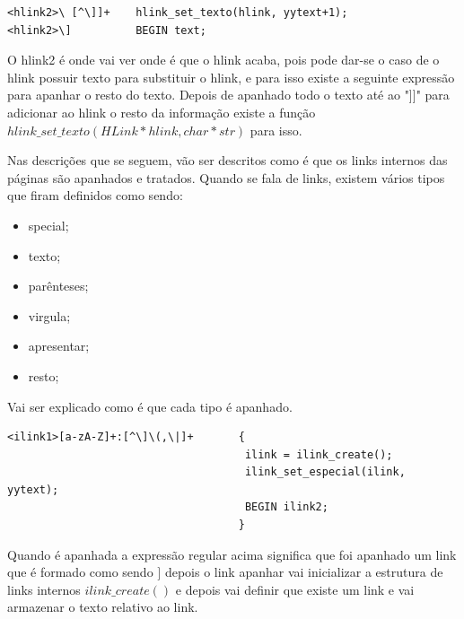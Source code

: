 \documentclass[11pt, a4paper, oneside]{article}
\begin{document}
\begin{verbatim}
<hlink2>\ [^\]]+    hlink_set_texto(hlink, yytext+1);
<hlink2>\]          BEGIN text;

\end{verbatim}

O hlink2 é onde vai ver onde é que o hlink acaba, pois pode dar-se o caso de o hlink possuir texto para substituir o hlink, e para isso existe a seguinte expressão para apanhar o resto do texto. Depois de apanhado todo o texto até ao "]]" para adicionar ao hlink o resto da informação existe a função \begin{math} hlink\_set\_texto(HLink* hlink, char* str) \end{math} para isso.

Nas descrições que se seguem, vão ser descritos como é que os links internos das páginas são apanhados e tratados.
Quando se fala de links, existem vários tipos que firam definidos como sendo:
\begin{itemize}
\item special;
\item texto;
\item parênteses;
\item virgula;
\item apresentar;
\item resto;
\end{itemize}


Vai ser explicado como é que cada tipo é apanhado.

\begin{verbatim}
<ilink1>[a-zA-Z]+:[^\]\(,\|]+       {
                                     ilink = ilink_create();
                                     ilink_set_especial(ilink, yytext);
                                     BEGIN ilink2;
                                    }
\end{verbatim}


Quando é apanhada a expressão regular acima significa que foi apanhado um link que é formado como sendo \begin{math}[[Category:Salts]]\end{math} depois o link apanhar vai inicializar a estrutura de links internos \begin{math} ilink\_create() \end{math} e depois vai definir que existe um link e vai armazenar o texto relativo ao link.
\end{document}
